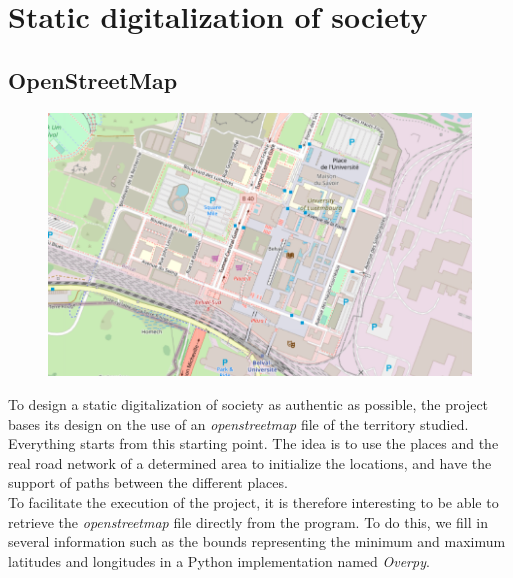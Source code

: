 \chapter{Static digitalization of society}

\section{OpenStreetMap}

\begin{figure}[h]
  \centering
  \includegraphics[width=0.8\linewidth]{media/belval_osm.png}
  \caption{}
  \label{fig:belvalosm}
\end{figure}

To design a static digitalization of society as authentic as possible, the project bases its design on the use of an \textit{openstreetmap} file of the territory studied. Everything starts from this starting point. The idea is to use the places and the real road network of a determined area to initialize the locations, and have the support of paths between the different places.\\

To facilitate the execution of the project, it is therefore interesting to be able to retrieve the \textit{openstreetmap} file directly from the program. To do this, we fill in several information such as the bounds representing the minimum and maximum latitudes and longitudes in a Python implementation named \textit{Overpy}.\\

